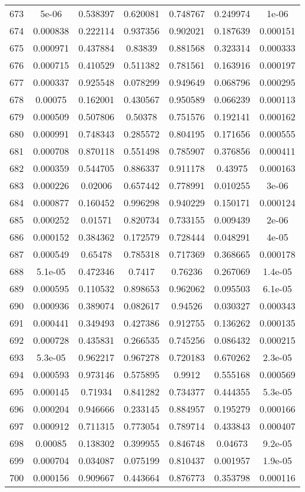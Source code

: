\begin{table}
\begin{tabular}{c|c|c|c|c|c|c}
673 & 5e-06 & 0.538397 & 0.620081 & 0.748767 & 0.249974 & 1e-06\\
674 & 0.000838 & 0.222114 & 0.937356 & 0.902021 & 0.187639 & 0.000151\\
675 & 0.000971 & 0.437884 & 0.83839 & 0.881568 & 0.323314 & 0.000333\\
676 & 0.000715 & 0.410529 & 0.511382 & 0.781561 & 0.163916 & 0.000197\\
677 & 0.000337 & 0.925548 & 0.078299 & 0.949649 & 0.068796 & 0.000295\\
678 & 0.00075 & 0.162001 & 0.430567 & 0.950589 & 0.066239 & 0.000113\\
679 & 0.000509 & 0.507806 & 0.50378 & 0.751576 & 0.192141 & 0.000162\\
680 & 0.000991 & 0.748343 & 0.285572 & 0.804195 & 0.171656 & 0.000555\\
681 & 0.000708 & 0.870118 & 0.551498 & 0.785907 & 0.376856 & 0.000411\\
682 & 0.000359 & 0.544705 & 0.886337 & 0.911178 & 0.43975 & 0.000163\\
683 & 0.000226 & 0.02006 & 0.657442 & 0.778991 & 0.010255 & 3e-06\\
684 & 0.000877 & 0.160452 & 0.996298 & 0.940229 & 0.150171 & 0.000124\\
685 & 0.000252 & 0.01571 & 0.820734 & 0.733155 & 0.009439 & 2e-06\\
686 & 0.000152 & 0.384362 & 0.172579 & 0.728444 & 0.048291 & 4e-05\\
687 & 0.000549 & 0.65478 & 0.785318 & 0.717369 & 0.368665 & 0.000178\\
688 & 5.1e-05 & 0.472346 & 0.7417 & 0.76236 & 0.267069 & 1.4e-05\\
689 & 0.000595 & 0.110532 & 0.898653 & 0.962062 & 0.095503 & 6.1e-05\\
690 & 0.000936 & 0.389074 & 0.082617 & 0.94526 & 0.030327 & 0.000343\\
691 & 0.000441 & 0.349493 & 0.427386 & 0.912755 & 0.136262 & 0.000135\\
692 & 0.000728 & 0.435831 & 0.266535 & 0.745256 & 0.086432 & 0.000215\\
693 & 5.3e-05 & 0.962217 & 0.967278 & 0.720183 & 0.670262 & 2.3e-05\\
694 & 0.000593 & 0.973146 & 0.575895 & 0.9912 & 0.555168 & 0.000569\\
695 & 0.000145 & 0.71934 & 0.841282 & 0.734377 & 0.444355 & 5.3e-05\\
696 & 0.000204 & 0.946666 & 0.233145 & 0.884957 & 0.195279 & 0.000166\\
697 & 0.000912 & 0.711315 & 0.773054 & 0.789714 & 0.433843 & 0.000407\\
698 & 0.00085 & 0.138302 & 0.399955 & 0.846748 & 0.04673 & 9.2e-05\\
699 & 0.000704 & 0.034087 & 0.075199 & 0.810437 & 0.001957 & 1.9e-05\\
700 & 0.000156 & 0.909667 & 0.443664 & 0.876773 & 0.353798 & 0.000116\\
\end{tabular}
\end{table}
